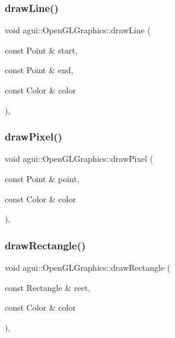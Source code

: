 \subsubsection{\texorpdfstring{draw\+Line()}{drawLine()}}
{\footnotesize\ttfamily void agui\+::\+Open\+G\+L\+Graphics\+::draw\+Line (\begin{DoxyParamCaption}\item[{const Point \&}]{start,  }\item[{const Point \&}]{end,  }\item[{const Color \&}]{color }\end{DoxyParamCaption})\hspace{0.3cm}{\ttfamily [override]}, {\ttfamily [virtual]}}

\mbox{\label{classagui_1_1_open_g_l_graphics_a333364e89726e8f7248e050c3bb8ee5a}} 
\subsubsection{\texorpdfstring{draw\+Pixel()}{drawPixel()}}
{\footnotesize\ttfamily void agui\+::\+Open\+G\+L\+Graphics\+::draw\+Pixel (\begin{DoxyParamCaption}\item[{const Point \&}]{point,  }\item[{const Color \&}]{color }\end{DoxyParamCaption})\hspace{0.3cm}{\ttfamily [override]}, {\ttfamily [virtual]}}

\mbox{\label{classagui_1_1_open_g_l_graphics_a88a6af03611b93169c197167c2c014fe}} 
\subsubsection{\texorpdfstring{draw\+Rectangle()}{drawRectangle()}}
{\footnotesize\ttfamily void agui\+::\+Open\+G\+L\+Graphics\+::draw\+Rectangle (\begin{DoxyParamCaption}\item[{const Rectangle \&}]{rect,  }\item[{const Color \&}]{color }\end{DoxyParamCaption})\hspace{0.3cm}{\ttfamily [override]}, {\ttfamily [virtual]}}

